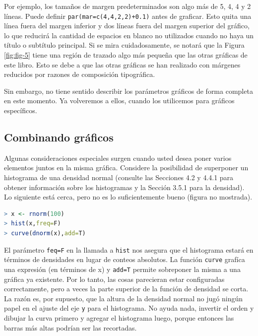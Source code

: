 Por ejemplo, los tamaños de margen predeterminados son algo más de 5, 4, 4 y 2
líneas.  Puede definir \texttt{par(mar=c(4,4,2,2)+0.1)} antes de graficar. Esto
quita una línea fuera del margen inferior y dos líneas fuera del margen superior
del gráfico, lo que reducirá la cantidad de espacios en blanco no utilizados
cuando no haya un título o subtítulo principal. Si se mira cuidadosamente, se
notará que la Figura \ref{fig:fig-5} tiene una región de trazado algo más
pequeña que las otras gráficas de este libro. Esto se debe a que las otras
gráficas se han realizado con márgenes reducidos por razones de composición
tipográfica.

Sin embargo, no tiene sentido describir los parámetros gráficos de forma
completa en este momento. Ya volveremos a ellos, cuando los utilicemos 
para gráficos específicos.

\subsection{Combinando gráficos}\label{combigraf}

Algunas consideraciones especiales surgen cuando usted desea poner varios
elementos juntos en la misma gráfica. Considere la posibilidad de superponer un
histograma de una densidad normal (consulte las Secciones 4.2 y 4.4.1 para
obtener información sobre los histogramas y la Sección 3.5.1 para la densidad).
Lo siguiente está cerca, pero no es lo suficientemente bueno (figura no
mostrada).

\begin{lstlisting}[language=R]
> x <- rnorm(100)
> hist(x,freq=F)
> curve(dnorm(x),add=T)
\end{lstlisting}

El parámetro \texttt{feq=F} en la llamada a \texttt{hist} nos asegura que el
histograma estará en términos de densidades en lugar de conteos absolutos.  La
función \texttt{curve} grafíca una expresión (en términos de x) y \texttt{add=T}
permite sobreponer la misma a una gráfica ya existente.  Por lo tanto, las cosas
parecieran estar configuradas correctamente, pero a veces la parte superior de
la función de densidad se corta. La razón es, por supuesto, que la altura de la
densidad normal no jugó ningún papel en el ajuste del eje \texttt{y} para el
histograma. No ayuda nada,  invertir el orden y dibujar la curva primero y
agregar el histograma luego, porque entonces las barras más altas podrían ser
las recortadas.

